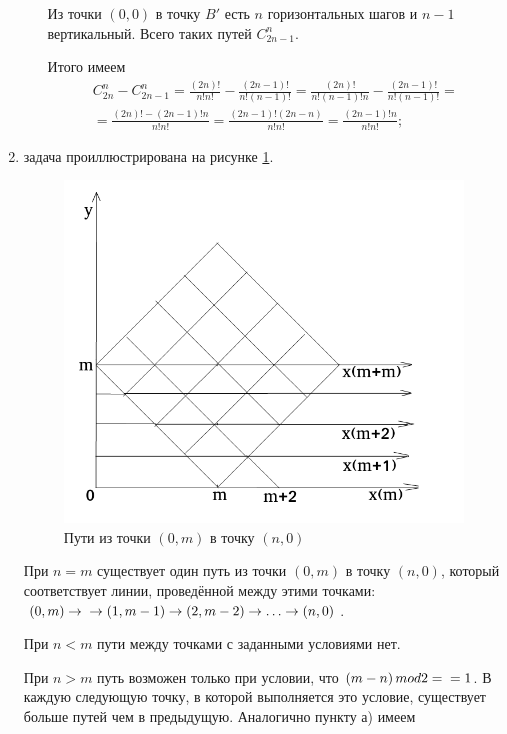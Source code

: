 \begin{enumerate}[label=\alph*)]
\begin{enumerate}[label=(\roman*)]
Из точки $ \left( 0, 0 \right) $ в точку $B'$ есть $n$ горизонтальных шагов и $n - 1$ вертикальный.
Всего таких путей $C_{2n-1}^n$.

Итого имеем
\begin{equation*}
\begin{split}
C_{2n}^n - C_{2n-1}^n =
\frac{ \left( 2n \right)!}{n! n!} - \frac{ \left( 2n-1 \right)!}{n! \left( n-1 \right)!} =
\frac{ \left( 2n \right)!}{n! \left( n-1 \right)! n} - \frac{ \left( 2n-1 \right)!}{n! \left( n-1 \right)!} = \\
= \frac{ \left( 2n \right)! - \left( 2n-1 \right)! n}{n! n!} =
\frac{ \left( 2n-1 \right)! \left( 2n-n \right)}{n! n!} =
\frac{ \left( 2n-1 \right)! n}{n! n!};
\end{split}
\end{equation*}
\end{enumerate}

\item задача проиллюстрирована на рисунке \ref{fig:4222}.

\begin{figure}[h!]
  \centering
  \includegraphics[width=.6\textwidth]{./pictures/4_22_2.png}
  \caption{Пути из точки $ \left( 0, m \right) $ в точку $ \left( n, 0 \right) $}
  \label{fig:4222}
\end{figure}

При $n = m$
существует один путь из точки
$ \left( 0, m \right) $
в точку
$ \left( n, 0 \right)$,
который соответствует линии,
проведённой между этими точками:
$ \left( 0, m \right) \rightarrow \\
\rightarrow \left( 1, m-1 \right) \rightarrow
\left( 2, m-2 \right) \rightarrow \dotsc \rightarrow \left( n, 0 \right)$.

При $n < m$ пути между точками с заданными условиями нет.

При $n > m$ путь возможен только при условии, что $ \left( m-n \right) mod 2 = \\ = 1$.
В каждую следующую точку, в которой выполняется это условие, существует больше путей чем в предыдущую.
Аналогично пункту а) имеем


\end{enumerate}
